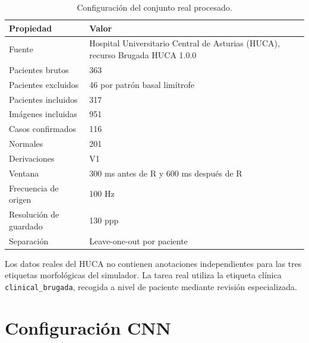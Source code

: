 \begin{table}[H]
  \centering
  \small
  \begin{tabularx}{0.94\textwidth}{p{4.4cm}X}
    \toprule
    Propiedad & Valor \\
    \midrule
    Fuente & Hospital Universitario Central de Asturias (HUCA), recurso Brugada HUCA 1.0.0 \\
    Pacientes brutos & 363 \\
    Pacientes excluidos & 46 por patrón basal limítrofe \\
    Pacientes incluidos & 317 \\
    Imágenes incluidas & 951 \\
    Casos confirmados & 116 \\
    Normales & 201 \\
    Derivaciones & V1 \\
    Ventana & 300 ms antes de R y 600 ms después de R \\
    Frecuencia de origen & 100 Hz \\
    Resolución de guardado & 130 ppp \\
    Separación & Leave-one-out por paciente \\
    \bottomrule
  \end{tabularx}
  \caption{Configuración del conjunto real procesado.}
  \label{tab:config_huca_final}
\end{table}

Los datos reales del HUCA no contienen anotaciones independientes para las tres etiquetas morfológicas del simulador. La tarea real utiliza la etiqueta clínica \texttt{clinical\_brugada}, recogida a nivel de paciente mediante revisión especializada.

\section{Configuración CNN}

